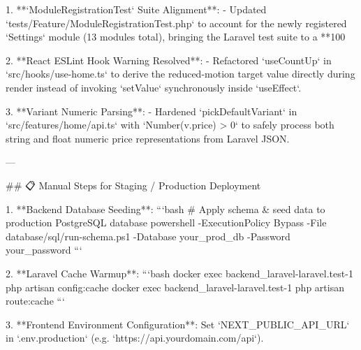 1. **`ModuleRegistrationTest` Suite Alignment**:
   - Updated `tests/Feature/ModuleRegistrationTest.php` to account for the newly registered `Settings` module (13 modules total), bringing the Laravel test suite to a **100%

2. **React ESLint Hook Warning Resolved**:
   - Refactored `useCountUp` in `src/hooks/use-home.ts` to derive the reduced-motion target value directly during render instead of invoking `setValue` synchronously inside `useEffect`.

3. **Variant Numeric Parsing**:
   - Hardened `pickDefaultVariant` in `src/features/home/api.ts` with `Number(v.price) > 0` to safely process both string and float numeric price representations from Laravel JSON.

---

## 📋 Manual Steps for Staging / Production Deployment

1. **Backend Database Seeding**:
   ```bash
   # Apply schema & seed data to production PostgreSQL database
   powershell -ExecutionPolicy Bypass -File database/sql/run-schema.ps1 -Database your_prod_db -Password your_password
   ```

2. **Laravel Cache Warmup**:
   ```bash
   docker exec backend_laravel-laravel.test-1 php artisan config:cache
   docker exec backend_laravel-laravel.test-1 php artisan route:cache
   ```

3. **Frontend Environment Configuration**:
   Set `NEXT_PUBLIC_API_URL` in `.env.production` (e.g. `https://api.yourdomain.com/api`).